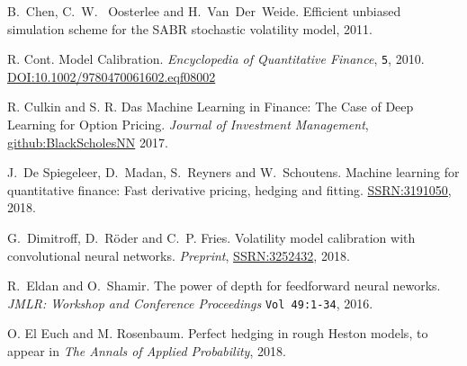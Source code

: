 \documentclass{article}
\theoremstyle{remark}
\begin{document}
\begin{thebibliography}{99}

 B.~Chen, C.~W. ~Oosterlee and H.~Van~Der~Weide. Efficient unbiased simulation scheme for the SABR stochastic volatility model, 2011.


R. Cont.
Model Calibration.
\textit{Encyclopedia of Quantitative Finance},
{\tt 5}, 2010. \href{https://doi.org/10.1002/9780470061602.eqf08002
}{DOI:10.1002/9780470061602.eqf08002}

R. Culkin and S. R. Das 
Machine Learning in Finance: The Case of Deep Learning for Option Pricing. 
\textit{Journal of Investment Management}, \href{https:srdas.github.io/Papers/BlackScholesNN.pdf}{github:BlackScholesNN} 2017.


 J.~De Spiegeleer, D.~Madan, S.~Reyners and W.~Schoutens. Machine learning for quantitative finance:
Fast derivative pricing, hedging and fitting. \href{https://papers.ssrn.com/sol3/papers.cfm?abstract_id=3191050}{SSRN:3191050}, 2018.

 G.~Dimitroff, D.~R\"oder and C.~P. Fries. Volatility model calibration with convolutional neural networks. \textit{Preprint}, \href{https://papers.ssrn.com/sol3/papers.cfm?abstract_id=3252432}{SSRN:3252432}, 2018.

R.~Eldan and O.~Shamir. The power of depth for feedforward neural neworks. \textit{JMLR: Workshop and Conference Proceedings} {\tt Vol 49:1-34}, 2016.



O. El Euch and M. Rosenbaum.
Perfect hedging in rough Heston models, to appear in
\textit{The Annals of Applied Probability}, 2018.


\end{thebibliography}
\end{document}
